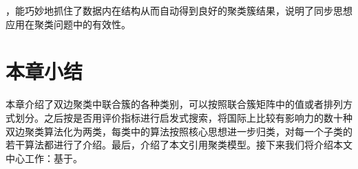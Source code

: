 
，能巧妙地抓住了数据内在结构从而自动得到良好的聚类簇结果，说明了同步思想应用在聚类问题中的有效性。

\section{本章小结}
本章介绍了双边聚类中联合簇的各种类别，可以按照联合簇矩阵中的值或者排列方式划分。之后按是否用评价指标进行启发式搜索，将国际上比较有影响力的数十种双边聚类算法化为两类，每类中的算法按照核心思想进一步归类，对每一个子类的若干算法都进行了介绍。最后，介绍了本文引用聚类模型。接下来我们将介绍本文中心工作：基于\cosync。
